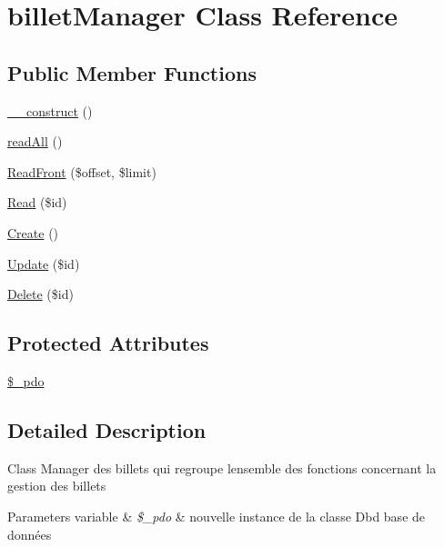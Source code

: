 \hypertarget{class_src_1_1_managers_1_1billet_manager}{}\section{billet\+Manager Class Reference}
\label{class_src_1_1_managers_1_1billet_manager}
\subsection*{Public Member Functions}
\begin{DoxyCompactItemize}
\item 
\hyperlink{class_src_1_1_managers_1_1billet_manager_a095c5d389db211932136b53f25f39685}{\+\_\+\+\_\+construct} ()
\item 
\hyperlink{class_src_1_1_managers_1_1billet_manager_a13805b8509481a55ad18465816e97d39}{read\+All} ()
\item 
\hyperlink{class_src_1_1_managers_1_1billet_manager_af7e26a4a8ffd767a1265151f87860ddb}{Read\+Front} (\$offset, \$limit)
\item 
\hyperlink{class_src_1_1_managers_1_1billet_manager_ad2bbc9b3130abdfe3a9fc9e9fe36716f}{Read} (\$id)
\item 
\hyperlink{class_src_1_1_managers_1_1billet_manager_ad01f71fa0ecc039494e3c282864298c3}{Create} ()
\item 
\hyperlink{class_src_1_1_managers_1_1billet_manager_a82232b33fbfacdbdb8a8f49acaecf564}{Update} (\$id)
\item 
\hyperlink{class_src_1_1_managers_1_1billet_manager_a59113b5ecd1d155db6a4f30af34a1e80}{Delete} (\$id)
\end{DoxyCompactItemize}
\subsection*{Protected Attributes}
\begin{DoxyCompactItemize}
\item 
\hyperlink{class_src_1_1_managers_1_1billet_manager_a1e6d977917b70dce7e26cebad8438bf4}{\$\+\_\+pdo}
\end{DoxyCompactItemize}


\subsection{Detailed Description}
Class Manager des billets qui regroupe l\textquotesingle{}ensemble des fonctions concernant la gestion des billets 
\begin{DoxyParams}[1]{Parameters}
variable & {\em \$\+\_\+pdo} & nouvelle instance de la classe Dbd base de données \\
\hline
\end{DoxyParams}


